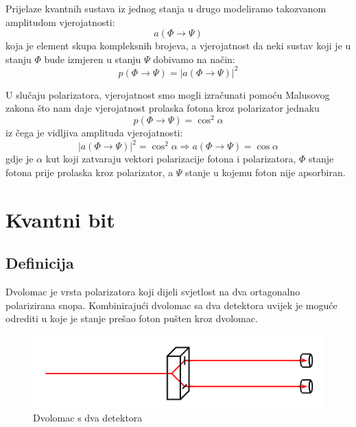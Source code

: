 Prijelaze kvantnih sustava iz jednog stanja u drugo modeliramo takozvanom amplitudom vjerojatnosti:
\begin{equation}
a(\Phi \rightarrow \Psi)
\end{equation}
koja je element skupa kompleksnih brojeva, a vjerojatnost da neki sustav koji je u stanju $\Phi$ bude izmjeren u stanju $\Psi$ dobivamo na način:
\begin{equation}
p(\Phi \rightarrow \Psi) = |a(\Phi \rightarrow \Psi)|^2
\end{equation}

U slučaju polarizatora, vjerojatnost smo mogli izračunati pomoću Malusovog zakona što nam daje vjerojatnost prolaska fotona kroz polarizator jednaku
\begin{equation}
p(\Phi \rightarrow \Psi) = \cos^2 \alpha
\end{equation}
iz čega je vidljiva amplituda vjerojatnosti:
\begin{equation}
|a(\Phi \rightarrow \Psi)|^2 = \cos^2 \alpha \Rightarrow a(\Phi \rightarrow \Psi) = \cos \alpha
\end{equation}
gdje je $\alpha$ kut koji zatvaraju vektori polarizacije fotona i polarizatora, $\Phi$ stanje fotona prije prolaska kroz polarizator, a $\Psi$ stanje u kojemu foton nije apsorbiran.



\section{Kvantni bit}

\subsection{Definicija}
Dvolomac je vrsta polarizatora koji dijeli svjetlost na dva ortagonalno polarizirana snopa. Kombinirajući dvolomac sa dva detektora uvijek je moguće odrediti u koje je stanje prešao foton pušten kroz dvolomac.
\begin{figure}[H]
\centering
\includegraphics[scale=0.5]{img/dvolomac_detektor.png}
\caption{Dvolomac s dva detektora} 
\end{figure}

